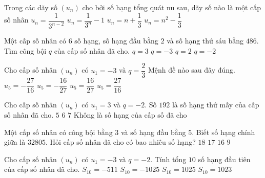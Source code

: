 \begin{ex}%
	Trong các dãy số $(u_n)$ cho bởi số hạng tổng quát nu sau, dãy số nào là một cấp số nhân
	\choice
	{\True 
		$u_n=\dfrac{1}{3^{n-2}}$}
	{$u_n=\dfrac{1}{3^{n}}-1$}
	{$u_n=n+\dfrac{1}{3}$}
	{$u_n=n^2-\dfrac{1}{3}$}
\end{ex}
\begin{ex}%
	Một cấp số nhân có $6$ số hạng, số hạng đầu bằng $2$ và số hạng thứ sáu bằng $486$. Tìm công bội $q$ của cấp số nhân đã cho.
	\choice
	{\True $q=3$}
	{$q=-3$}
	{$q=2$}
	{$q=-2$}
\end{ex}
\begin{ex}%
	Cho cấp số nhân $\left(u_n\right)$ có $u_1=-3$ và $q=\dfrac{2}{3}$ Mệnh đề nào sau đây đúng.
	\choice
	{$u_5=-\dfrac{27}{16}$}
	{\True $u_5=-\dfrac{16}{27}$}
	{$u_5=\dfrac{16}{27}$}
	{$u_5=\dfrac{27}{16}$}
\end{ex}
\begin{ex}%
	Cho cấp số nhân $\left(u_n\right)$ có $u_1=3$ và $q=-2$. Số $192$ là số hạng thứ mấy của cấp số nhân đã cho.
	\choice
	{$5$}
	{$6$}
	{\True $7$}
	{Không là số hạng của cấp số đã cho}
\end{ex}
\begin{ex}%
	Một cấp số nhân có công bội bằng $3$ và số hạng đầu bằng $5$. Biết số hạng chính giữa là $32805$. Hỏi cấp số nhân đã cho có bao nhiêu số hạng?
	\choice
	{$18$}
	{\True $17$}
	{$16$}
	{$9$}
\end{ex}
\begin{ex}%
	Cho cấp số nhân $\left(u_n\right)$ có $u_1=-3$ và $q=-2$. Tính tổng $10$ số hạng đầu tiên của cấp số nhân đã cho.
	\choice
	{$S_{10}=-511$}
	{$S_{10}=-1025$}
	{$S_{10}=1025$}
	{\True $S_{10}=1023$}
\end{ex}
